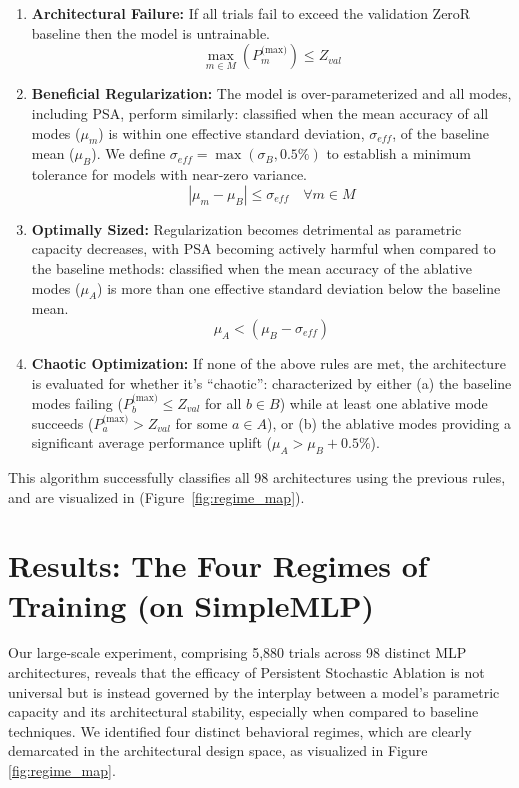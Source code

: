 \documentclass[conference]{IEEEtran}
\begin{document}
\begin{enumerate}
    \item \textbf{Architectural Failure:} If all trials fail to exceed the validation ZeroR baseline then the model is untrainable.
    \begin{equation}
        \max_{m \in M} (P_m^{\text{(max)}}) \le Z_{val}
    \end{equation}

    \item \textbf{Beneficial Regularization:} The model is over-parameterized and all modes, including PSA, perform similarly: classified when the mean accuracy of all modes ($\mu_m$) is within one effective standard deviation, $\sigma_{eff}$, of the baseline mean ($\mu_B$). We define $\sigma_{eff} = \max(\sigma_B, 0.5\%)$ to establish a minimum tolerance for models with near-zero variance.
    \begin{equation}
        |\mu_m - \mu_B| \le \sigma_{eff} \quad \forall m \in M
    \end{equation}

    \item \textbf{Optimally Sized:} Regularization becomes detrimental as parametric capacity decreases, with PSA becoming actively harmful when compared to the baseline methods: classified when the mean accuracy of the ablative modes ($\mu_A$) is more than one effective standard deviation below the baseline mean.
    \begin{equation}
        \mu_A < (\mu_B - \sigma_{eff})
    \end{equation}

    \item \textbf{Chaotic Optimization:} If none of the above rules are met, the architecture is evaluated for whether it's ``chaotic'': characterized by either (a) the baseline modes failing ($P_b^{\text{(max)}} \le Z_{val}$ for all $b \in B$) while at least one ablative mode succeeds ($P_a^{\text{(max)}} > Z_{val}$ for some $a \in A$), or (b) the ablative modes providing a significant average performance uplift ($\mu_A > \mu_B + 0.5\%$).\\
    
\end{enumerate}

This algorithm successfully classifies all 98 architectures using the previous rules, and are visualized in (Figure~\ref{fig:regime_map}).

\section{Results: The Four Regimes of Training (on SimpleMLP)}
Our large-scale experiment, comprising 5,880 trials across 98 distinct MLP architectures, reveals that the efficacy of Persistent Stochastic Ablation is not universal but is instead governed by the interplay between a model's parametric capacity and its architectural stability, especially when compared to baseline techniques. We identified four distinct behavioral regimes, which are clearly demarcated in the architectural design space, as visualized in Figure \ref{fig:regime_map}.
\end{document}
